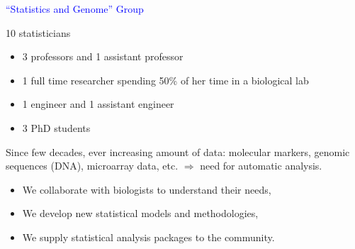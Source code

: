 \documentclass[dvips, lscape]{foils}
\newcommand{\textblue}[1]{\textcolor{blue}{#1}}
\newcommand{\chapter}[1]{
  \addtocounter{chapter}{1}
  \setcounter{section}{0}
  \setcounter{subsection}{0}
  {\centerline{\textblue{\LARGE #1}}}
  }
\newcommand{\paragraph}[1]{\noindent{\textblue{#1}}}
\begin{document}
\landscape
{}
\setcounter{chapter}{0}
\headrulewidth 0pt 
\pagestyle{fancy} 
\cfoot{}

\chapter{``Statistics and Genome'' Group} 

\paragraph{Who are we?} {10 statisticians}
\begin{itemize}
\item 3 professors and 1 assistant professor
\item 1 full time researcher spending 50\% of her time in a biological lab
\item 1 engineer and 1 assistant engineer
\item 3 PhD students
\end{itemize}

\paragraph{What do we do ?} 
Since few decades, ever increasing amount of data: molecular markers,
genomic sequences (DNA), microarray data, etc.  $\Rightarrow$ need for
automatic analysis.
\begin{itemize}
\item We collaborate with biologists to understand their needs, 
\item We develop new statistical models and methodologies,
\item We supply statistical analysis packages to the community.
\end{itemize}
\end{document}
